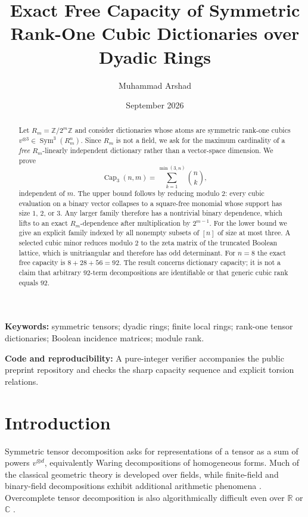 \documentclass[11pt]{article}
\title{\textbf{Exact Free Capacity of Symmetric Rank-One Cubic Dictionaries over Dyadic Rings}}
\author{Muhammad Arshad}
\date{September 2026}
\theoremstyle{definition}
\newcommand{\Z}{\mathbb Z}
\newcommand{\Sym}{\operatorname{Sym}}
\newcommand{\CubCap}{\operatorname{Cap}}
\begin{document}
\maketitle

\begin{abstract}
Let \(R_m=\Z/2^m\Z\) and consider dictionaries whose atoms are symmetric rank-one cubics \(v^{\otimes3}\in\Sym^3(R_m^n)\). Since \(R_m\) is not a field, we ask for the maximum cardinality of a \emph{free} \(R_m\)-linearly independent dictionary rather than a vector-space dimension. We prove
\[
\CubCap_3(n,m)=\sum_{k=1}^{\min(3,n)}\binom nk,
\]
independent of \(m\). The upper bound follows by reducing modulo \(2\): every cubic evaluation on a binary vector collapses to a square-free monomial whose support has size \(1\), \(2\), or \(3\). Any larger family therefore has a nontrivial binary dependence, which lifts to an exact \(R_m\)-dependence after multiplication by \(2^{m-1}\). For the lower bound we give an explicit family indexed by all nonempty subsets of \([n]\) of size at most three. A selected cubic minor reduces modulo \(2\) to the zeta matrix of the truncated Boolean lattice, which is unitriangular and therefore has odd determinant. For \(n=8\) the exact free capacity is \(8+28+56=92\). The result concerns dictionary capacity; it is not a claim that arbitrary \(92\)-term decompositions are identifiable or that generic cubic rank equals \(92\).
\end{abstract}

\noindent\textbf{Keywords:} symmetric tensors; dyadic rings; finite local rings; rank-one tensor dictionaries; Boolean incidence matrices; module rank.

\medskip
\noindent\textbf{Code and reproducibility:} A pure-integer verifier accompanies the public preprint repository and checks the sharp capacity sequence and explicit torsion relations.

\section{Introduction}
Symmetric tensor decomposition asks for representations of a tensor as a sum of powers \(v^{\otimes d}\), equivalently Waring decompositions of homogeneous forms. Much of the classical geometric theory is developed over fields, while finite-field and binary-field decompositions exhibit additional arithmetic phenomena \cite{SongZhengHuang2022,CotardoZullo2026}. Overcomplete tensor decomposition is also algorithmically difficult even over \(\mathbb R\) or \(\mathbb C\) \cite{KothariMoitraWein2025}.
\end{document}
